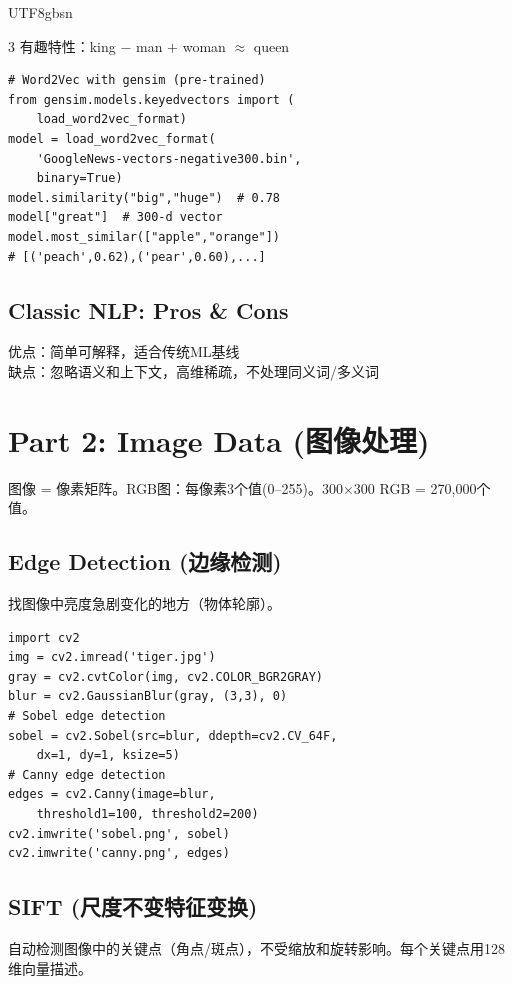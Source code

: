 \documentclass[9pt,landscape,a4paper]{article}
\newcommand{\zhint}[1]{{\scriptsize\color{gray!70!black}#1}}
\begin{document}
\begin{CJK}{UTF8}{gbsn}
\begin{multicols}{3}
\zhint{有趣特性：king $-$ man $+$ woman $\approx$ queen}

\begin{lstlisting}
# Word2Vec with gensim (pre-trained)
from gensim.models.keyedvectors import (
    load_word2vec_format)
model = load_word2vec_format(
    'GoogleNews-vectors-negative300.bin',
    binary=True)
model.similarity("big","huge")  # 0.78
model["great"]  # 300-d vector
model.most_similar(["apple","orange"])
# [('peach',0.62),('pear',0.60),...]
\end{lstlisting}

\subsection{Classic NLP: Pros \& Cons}
\zhint{优点：简单可解释，适合传统ML基线}\\
\zhint{缺点：忽略语义和上下文，高维稀疏，不处理同义词/多义词}

\section{Part 2: Image Data \zhint{(图像处理)}}

\zhint{图像 = 像素矩阵。RGB图：每像素3个值(0--255)。300$\times$300 RGB = 270,000个值。}

\subsection{Edge Detection \zhint{(边缘检测)}}
\zhint{找图像中亮度急剧变化的地方（物体轮廓）。}

\begin{lstlisting}
import cv2
img = cv2.imread('tiger.jpg')
gray = cv2.cvtColor(img, cv2.COLOR_BGR2GRAY)
blur = cv2.GaussianBlur(gray, (3,3), 0)
# Sobel edge detection
sobel = cv2.Sobel(src=blur, ddepth=cv2.CV_64F,
    dx=1, dy=1, ksize=5)
# Canny edge detection
edges = cv2.Canny(image=blur,
    threshold1=100, threshold2=200)
cv2.imwrite('sobel.png', sobel)
cv2.imwrite('canny.png', edges)
\end{lstlisting}

\subsection{SIFT \zhint{(尺度不变特征变换)}}
\zhint{自动检测图像中的关键点（角点/斑点），不受缩放和旋转影响。每个关键点用128维向量描述。}


\end{multicols}
\end{CJK}
\end{document}
